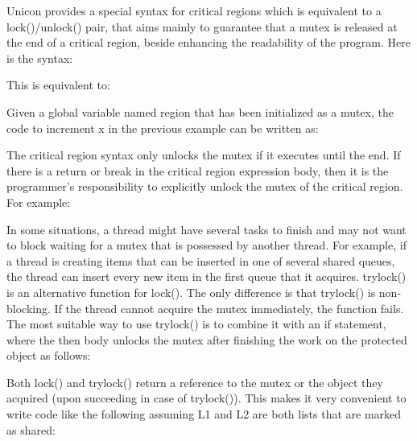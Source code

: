 Unicon provides a special syntax for critical regions which is
equivalent to a \textsf{lock()}/\textsf{unlock()}
pair, that aims mainly to guarantee that a mutex is released at the end
of a critical region, beside enhancing the readability of the program.
Here is the syntax:


This is equivalent to:


Given a global variable named \textsf{region} that has
been initialized as a mutex, the code to increment
\textsf{x} in the previous example can be written as:


The critical region syntax only unlocks the mutex if it executes until
the end. If there is a return or break in the critical region
expression body, then it is the programmer{\textquoteright}s
responsibility to explicitly unlock the mutex of the critical region.
For example:


In some situations, a thread might have several tasks to finish and may
not want to block waiting for a mutex that is possessed by another
thread. For example, if a thread is creating items that can be inserted
in one of several shared queues, the thread can insert every new item
in the first queue that it acquires. \textsf{trylock()}
is an alternative function for \textsf{lock()}. The
only difference is that \textsf{trylock()} is
non-blocking. If the thread cannot acquire the mutex immediately, the
function fails. The most suitable way to use
\textsf{trylock()} is to combine it with an
\textsf{if} statement, where the
\textsf{then} body unlocks the mutex after finishing
the work on the protected object as follows:


Both \textsf{lock()} and \textsf{trylock()}
return a reference to the mutex or the object they acquired (upon
succeeding in case of \textsf{trylock()}). This makes
it very convenient to write code like the following assuming L1 and L2
are both lists that are marked as shared:

